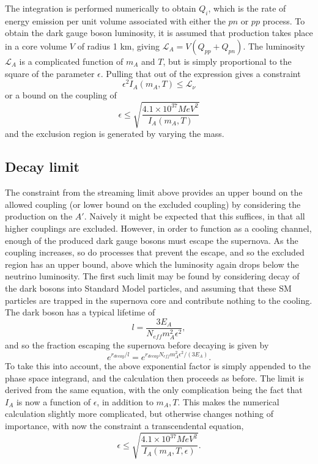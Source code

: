 \documentclass[nofootinbib,prd,superscriptaddress,twocolumn]{revtex4}
\newcommand{\beq}{\begin{equation}}
\newcommand{\eeq}{\end{equation}}
\begin{document}
The integration is performed numerically to obtain $ Q_i$, which is the rate of energy emission per unit volume associated with either the $pn$ or $pp$ process. To obtain the dark gauge boson luminosity, it is assumed that production takes place in a core volume $V$ of radius 1 km, giving $ \mathcal{L}_A = V(Q_{pp} + Q_{pn}) $. The luminosity $\mathcal{L}_A $ is a complicated function of $ m_A $ and $ T $, but is simply proportional to the square of the parameter $ \epsilon $.  Pulling that out of the expression gives a constraint 
\beq
\epsilon^2 I_A(m_A, T) \le \mathcal{L}_\nu
\eeq
or a bound on the coupling of 
\beq 
\epsilon \le \sqrt{\frac{4.1 \times 10^{37} MeV^2}{I_A(m_A, T)}} 
\eeq 
and the exclusion region is generated by varying the mass. 

\subsection{Decay limit}
The constraint from the streaming limit above provides an upper bound on the allowed coupling (or lower bound on the excluded coupling) by considering the production on the $A'$. Naively it might be expected that this suffices, in that all higher couplings are excluded. However, in order to function as a cooling channel, enough of the produced dark gauge bosons must escape the supernova. As the coupling increases, so do processes that prevent the escape, and so the excluded region has an upper bound, above which the luminosity again drops below the neutrino luminosity. The first such limit may be found by considering decay of the dark bosons into Standard Model particles, and assuming that these SM particles are trapped in the supernova core and contribute nothing to the cooling. The dark boson has a typical lifetime of 
\beq
l = \frac{3 E_{A}}{N_{eff} m_A^2 \epsilon^2},
\eeq
and so the fraction escaping the supernova before decaying is given by 
\beq
e^{r_{decay}/l} = e^{r_{decay} N_{eff} m_A^2 \epsilon^2/(3 E_A)}.
\eeq
To take this into account, the above exponential factor is simply appended to the phase space integrand, and the calculation then proceeds as before. The limit is derived from the same equation, with the only complication being the fact that $ I_A $ is now a function of $ \epsilon $, in addition to $ m_A, T $. This makes the numerical calculation slightly more complicated, but otherwise changes nothing of importance, with now the constraint a transcendental equation,  
\beq
\epsilon \le \sqrt{\frac{4.1 \times 10^{37} MeV^2}{I_A(m_A, T, \epsilon)}}.
\eeq
	
\end{document}
